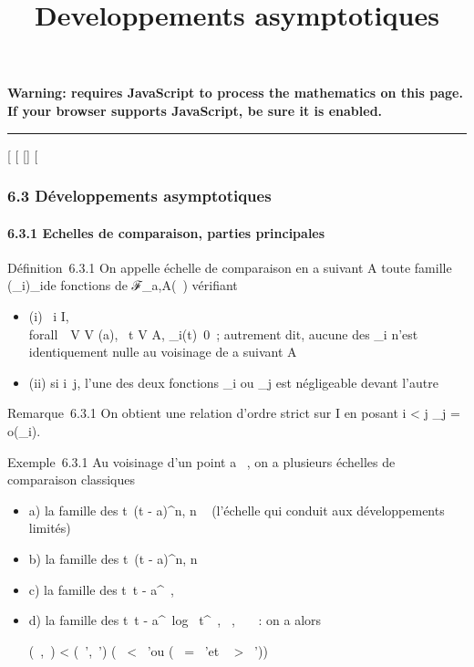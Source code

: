 \documentclass[]{article}
\title{Developpements asymptotiques}
\author{}
\date{}
\begin{document}
\maketitle

\textbf{Warning: 
requires JavaScript to process the mathematics on this page.\\ If your
browser supports JavaScript, be sure it is enabled.}

\begin{center}\rule{3in}{0.4pt}\end{center}

[
[
[]
[

\subsubsection{6.3 Développements asymptotiques}

\paragraph{6.3.1 Echelles de comparaison, parties principales}

Définition~6.3.1 On appelle échelle de comparaison en a suivant A toute
famille (\phi_i)_i\inI de fonctions de ℱ_a,A(~)
vérifiant

\begin{itemize}
\itemsep1pt\parskip0pt
\item
  (i) \forall~i \in I, \\forall~~V \in V
  (a), \exists~t \in V \bigcap A,
  \phi_i(t)\neq~0~; autrement dit, aucune
  des \phi_i n'est identiquement nulle au voisinage de a suivant A
\item
  (ii) si i\neq~j, l'une des deux fonctions
  \phi_i ou \phi_j est négligeable devant l'autre
\end{itemize}

Remarque~6.3.1 On obtient une relation d'ordre strict sur I en posant i
< j \Leftrightarrow \phi_j =
o(\phi_i).

Exemple~6.3.1 Au voisinage d'un point a \in {}~, on a plusieurs échelles de
comparaison classiques

\begin{itemize}
\item
  a) la famille des t\mapsto~(t - a)^n, n
  \in {}~ (l'échelle qui conduit aux développements limités)
\item
  b) la famille des t\mapsto~(t - a)^n, n
  \in {}
\item
  c) la famille des t\mapsto~t -
  a^\alpha~, \alpha~ \in {}~
\item
  d) la famille des t\mapsto~t -
  a^\alpha~log~
  t^\beta~, \alpha~,\beta~ \in {}~~: on a alors

  (\alpha~,\beta~) < (\alpha~',\beta~') \Leftrightarrow
  \bigl (\alpha~ < \alpha~'\text ou (\alpha~
  = \alpha~'\text et \beta~ >
  \beta~')\bigr )
\end{itemize}
\end{document}

